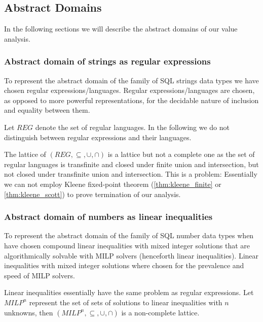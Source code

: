 \subsection{Abstract Domains}\label{subsec:abstract-domains}

In the following sections we will describe the abstract domains of our value analysis.

\subsubsection{Abstract domain of strings as regular expressions}\label{subsubsec:abstract_domains_strings}

To represent the abstract domain of the family of SQL strings data types we have chosen regular expressions/languages.
Regular expressions/languages are chosen, as opposed to more powerful representations, for the decidable nature of inclusion and equality between them.

Let $REG$ denote the set of regular languages. %
In the following we do not distinguish between regular expressions and their languages.

The lattice of $(REG, \subseteq, \cup, \cap)$ is a lattice but not a complete one as the set of regular languages is transfinite and closed under finite union and intersection, but not closed under transfinite union and intersection.
This is a problem: Essentially we can not employ Kleene fixed-point theorem (\autoref{thm:kleene_finite} or \autoref{thm:kleene_scott}) to prove termination of our analysis.

\subsubsection{Abstract domain of numbers as linear inequalities}\label{subsubsec:abstract_domains_numbers}

To represent the abstract domain of the family of SQL number data types when have chosen compound linear inequalities with mixed integer solutions that are algorithmically solvable with MILP solvers (henceforth linear inequalities).
Linear inequalities with mixed integer solutions where chosen for the prevalence and speed of MILP solvers.

Linear inequalities essentially have the same problem as regular expressions. Let $MILP^n$ represent the set of sets of solutions to linear inequalities with $n$ unknowns, then $(MILP^n, \subseteq, \cup, \cap)$ is a non-complete lattice.


